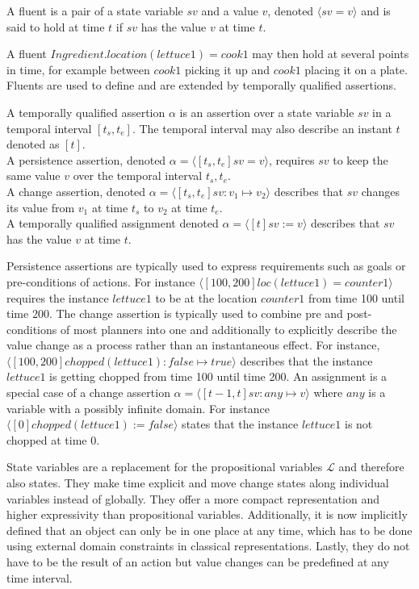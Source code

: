 \begin{definition}[Fluent]
  A fluent is a pair of a state variable $sv$ and a value $v$, denoted $\langle sv=v \rangle$ and is said to hold at time $t$ if $sv$ has the value $v$ at time $t$.
\end{definition}

A fluent $Ingredient.location(lettuce1) = cook1$ may then hold at several points in time, for example between $cook1$ picking it up and $cook1$ placing it on a plate.
Fluents are used to define and are extended by temporally qualified assertions.

\begin{definition}
  A temporally qualified assertion $\alpha$ is an assertion over a state variable $sv$ in a temporal interval $[t_s,t_e]$.
  The temporal interval may also describe an instant $t$ denoted as $[t]$.\\
  A persistence assertion, denoted $\alpha = \langle [t_s,t_e] sv=v \rangle$, requires $sv$ to keep the same value $v$ over the temporal interval $t_s,t_e$.\\
  A change assertion, denoted $\alpha = \langle [t_s,t_e] sv : v_1 \mapsto v_2 \rangle$ describes that $sv$ changes its value from $v_1$ at time $t_s$ to $v_2$ at time $t_e$. \\
  A temporally qualified assignment denoted $\alpha = \langle [t] sv := v \rangle$ describes that $sv$ has the value $v$ at time $t$.
\end{definition}

Persistence assertions are typically used to express requirements such as goals or pre-conditions of actions.
For instance $\langle[100,200] loc(lettuce1) = counter1\rangle$ requires the instance $lettuce1$ to be at the location $counter1$ from time 100 until time 200.
The change assertion is typically used to combine pre and post-conditions of most planners into one and additionally to explicitly describe the value change as a process rather than an instantaneous effect.
For instance, $\langle [100,200] chopped(lettuce1) : false \mapsto true \rangle$ describes that the instance $lettuce1$ is getting chopped from time 100 until time 200.
An assignment is a special case of a change assertion $\alpha = \langle [t-1,t] sv: any \mapsto v \rangle$ where $any$ is a variable with a possibly infinite domain.
For instance $\langle [0] chopped(lettuce1) := false \rangle$ states that the instance $lettuce1$ is not chopped at time 0.

State variables are a replacement for the propositional variables $\mathcal{L}$ and therefore also states.
They make time explicit and move change states along individual variables instead of globally.
They offer a more compact representation and higher expressivity than propositional variables.
Additionally, it is now implicitly defined that an object can only be in one place at any time, which has to be done using external domain constraints in classical representations. 
Lastly, they do not have to be the result of an action but value changes can be predefined at any time interval.

